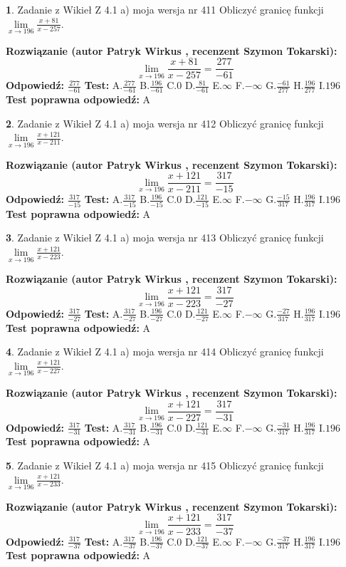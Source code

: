 \documentclass[12pt, a4paper]{article}
\theoremstyle{definition} %
\newtheorem{zad}{}
\newcommand{\zadStart}[1]{\begin{zad}#1\newline}
\newcommand{\zadStop}{\end{zad}}
\newcommand{\rozwStart}[2]{\noindent \textbf{Rozwiązanie (autor #1 , recenzent #2): }\newline}
\newcommand{\rozwStop}{\newline}
\newcommand{\odpStart}{\noindent \textbf{Odpowiedź:}\newline}
\newcommand{\odpStop}{\newline}
\newcommand{\testStart}{\noindent \textbf{Test:}\newline}
\newcommand{\testStop}{\newline}
\newcommand{\kluczStart}{\noindent \textbf{Test poprawna odpowiedź:}\newline}
\newcommand{\kluczStop}{\newline}
\begin{document}
\zadStart{Zadanie z Wikieł Z 4.1 a) moja wersja nr 411}
Obliczyć granicę funkcji $\lim\limits_{x\to196}\frac{x+81}{x-257}$.
\zadStop
\rozwStart{Patryk Wirkus}{Szymon Tokarski}
$$\lim\limits_{x\to196}\frac{x+81}{x-257} = \frac{277}{-61}$$
\rozwStop
\odpStart
$\frac{277}{-61}$
\odpStop
\testStart
A.$\frac{277}{-61}$
B.$\frac{196}{-61}$
C.$0$
D.$\frac{81}{-61}$
E.$\infty$
F.$-\infty$
G.$\frac{-61}{277}$
H.$\frac{196}{277}$
I.$196$
\testStop
\kluczStart
A
\kluczStop



\zadStart{Zadanie z Wikieł Z 4.1 a) moja wersja nr 412}
Obliczyć granicę funkcji $\lim\limits_{x\to196}\frac{x+121}{x-211}$.
\zadStop
\rozwStart{Patryk Wirkus}{Szymon Tokarski}
$$\lim\limits_{x\to196}\frac{x+121}{x-211} = \frac{317}{-15}$$
\rozwStop
\odpStart
$\frac{317}{-15}$
\odpStop
\testStart
A.$\frac{317}{-15}$
B.$\frac{196}{-15}$
C.$0$
D.$\frac{121}{-15}$
E.$\infty$
F.$-\infty$
G.$\frac{-15}{317}$
H.$\frac{196}{317}$
I.$196$
\testStop
\kluczStart
A
\kluczStop



\zadStart{Zadanie z Wikieł Z 4.1 a) moja wersja nr 413}
Obliczyć granicę funkcji $\lim\limits_{x\to196}\frac{x+121}{x-223}$.
\zadStop
\rozwStart{Patryk Wirkus}{Szymon Tokarski}
$$\lim\limits_{x\to196}\frac{x+121}{x-223} = \frac{317}{-27}$$
\rozwStop
\odpStart
$\frac{317}{-27}$
\odpStop
\testStart
A.$\frac{317}{-27}$
B.$\frac{196}{-27}$
C.$0$
D.$\frac{121}{-27}$
E.$\infty$
F.$-\infty$
G.$\frac{-27}{317}$
H.$\frac{196}{317}$
I.$196$
\testStop
\kluczStart
A
\kluczStop



\zadStart{Zadanie z Wikieł Z 4.1 a) moja wersja nr 414}
Obliczyć granicę funkcji $\lim\limits_{x\to196}\frac{x+121}{x-227}$.
\zadStop
\rozwStart{Patryk Wirkus}{Szymon Tokarski}
$$\lim\limits_{x\to196}\frac{x+121}{x-227} = \frac{317}{-31}$$
\rozwStop
\odpStart
$\frac{317}{-31}$
\odpStop
\testStart
A.$\frac{317}{-31}$
B.$\frac{196}{-31}$
C.$0$
D.$\frac{121}{-31}$
E.$\infty$
F.$-\infty$
G.$\frac{-31}{317}$
H.$\frac{196}{317}$
I.$196$
\testStop
\kluczStart
A
\kluczStop



\zadStart{Zadanie z Wikieł Z 4.1 a) moja wersja nr 415}
Obliczyć granicę funkcji $\lim\limits_{x\to196}\frac{x+121}{x-233}$.
\zadStop
\rozwStart{Patryk Wirkus}{Szymon Tokarski}
$$\lim\limits_{x\to196}\frac{x+121}{x-233} = \frac{317}{-37}$$
\rozwStop
\odpStart
$\frac{317}{-37}$
\odpStop
\testStart
A.$\frac{317}{-37}$
B.$\frac{196}{-37}$
C.$0$
D.$\frac{121}{-37}$
E.$\infty$
F.$-\infty$
G.$\frac{-37}{317}$
H.$\frac{196}{317}$
I.$196$
\testStop
\kluczStart
A
\kluczStop
\end{document}
